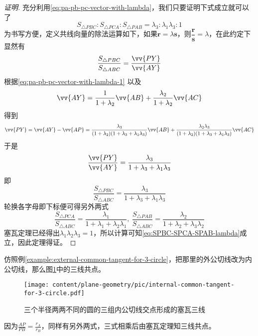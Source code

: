 \begin{example}
 \begin{proof}[证明]
   充分利用\autoref{eq:pa-pb-pc-vector-with-lambda}，我们只要证明下式成立就可以了
   \begin{equation}
     \label{eq:SPBC-SPCA-SPAB-lambda}
    S_{\triangle PBC} : S_{\triangle PCA} : S_{\triangle PAB} = \lambda_3 : \lambda_1\lambda_3 : 1 
   \end{equation}
   为书写方便，定义共线向量的除法运算如下，如果$\bm{r}=\lambda\bm{s}$，则$\dfrac{\bm{r}}{\bm{s}}=\lambda$，在此约定下显然有
   \[ \frac{S_{\triangle PBC}}{S_{\triangle ABC}} = \frac{\vv{PY}}{\vv{AY}} \]
   根据\autoref{eq:pa-pb-pc-vector-with-lambda-1} 以及
   \[ \vv{AY} = \frac{1}{1+\lambda_2}\vv{AB}+\frac{\lambda_2}{1+\lambda_2}\vv{AC} \]
   得到
   \[ \vv{PY} = \vv{AY} - \vv{AP} = \frac{\lambda_3}{(1+\lambda_2)(1+\lambda_3+\lambda_1\lambda_3)}\vv{AB} + \frac{\lambda_2\lambda_3}{(1+\lambda_2)(1+\lambda_3+\lambda_1\lambda_3)}\vv{AC} \]
   于是
   \[ \frac{\vv{PY}}{\vv{AY}} = \frac{\lambda_3}{1+\lambda_3+\lambda_1\lambda_3} \]
即
   \[ \frac{S_{\triangle PBC}}{S_{\triangle ABC}} = \frac{\lambda_3}{1+\lambda_3+\lambda_1\lambda_3} \]
   轮换各字母即下标便可得另外两式
   \[ \frac{S_{\triangle PCA}}{S_{\triangle ABC}} = \frac{\lambda_1}{1+\lambda_1+\lambda_2\lambda_1}, \  \frac{S_{\triangle PAB}}{S_{\triangle ABC}} = \frac{\lambda_2}{1+\lambda_2+\lambda_3\lambda_2}  \]
塞瓦定理已经得出$\lambda_1\lambda_2\lambda_3=1$，所以计算可知\autoref{eq:SPBC-SPCA-SPAB-lambda}成立，因此定理得证。
 \end{proof}

\end{example}

\begin{example}
  仿照例\ref{example:external-common-tangent-for-3-circle}，把那里的外公切线改为内公切线，那么图\ref{fig:internal-common-tangent-for-3-circle}中的三线共点。
 
\begin{figure}[htbp]
\centering
\texttt{[image: content/plane-geometry/pic/internal-common-tangent-for-3-circle.pdf]}
\caption{三个半径两两不同的圆的三组内公切线交点形成的塞瓦三线}
\label{fig:internal-common-tangent-for-3-circle}
\end{figure}

因为$\frac{AP}{PB}=\frac{r_A}{r_B}$，同样有另外两式，三式相乘后由塞瓦定理知三线共点。
\end{example}

